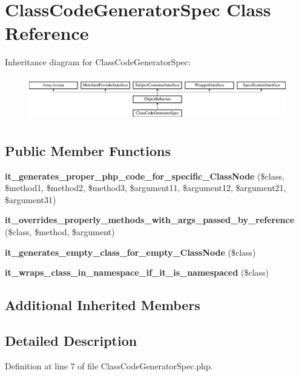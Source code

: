 \section{Class\+Code\+Generator\+Spec Class Reference}
\label{classspec_1_1_prophecy_1_1_doubler_1_1_generator_1_1_class_code_generator_spec}
Inheritance diagram for Class\+Code\+Generator\+Spec\+:\begin{figure}[H]
\begin{center}
\leavevmode
\includegraphics[height=1.953488cm]{classspec_1_1_prophecy_1_1_doubler_1_1_generator_1_1_class_code_generator_spec}
\end{center}
\end{figure}
\subsection*{Public Member Functions}
\begin{DoxyCompactItemize}
\item 
{\bf it\+\_\+generates\+\_\+proper\+\_\+php\+\_\+code\+\_\+for\+\_\+specific\+\_\+\+Class\+Node} (\$class, \$method1, \$method2, \$method3, \$argument11, \$argument12, \$argument21, \$argument31)
\item 
{\bf it\+\_\+overrides\+\_\+properly\+\_\+methods\+\_\+with\+\_\+args\+\_\+passed\+\_\+by\+\_\+reference} (\$class, \$method, \$argument)
\item 
{\bf it\+\_\+generates\+\_\+empty\+\_\+class\+\_\+for\+\_\+empty\+\_\+\+Class\+Node} (\$class)
\item 
{\bf it\+\_\+wraps\+\_\+class\+\_\+in\+\_\+namespace\+\_\+if\+\_\+it\+\_\+is\+\_\+namespaced} (\$class)
\end{DoxyCompactItemize}
\subsection*{Additional Inherited Members}


\subsection{Detailed Description}


Definition at line 7 of file Class\+Code\+Generator\+Spec.\+php.




